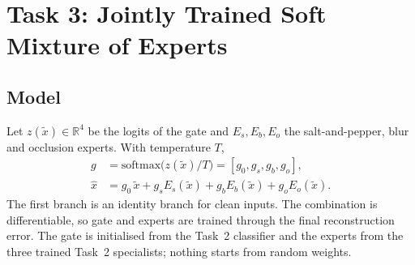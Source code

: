 \documentclass[conference]{IEEEtran}
\begin{document}
\section{Task 3: Jointly Trained Soft Mixture of Experts}
\subsection{Model}
Let $z(\tilde{x})\in\mathbb{R}^4$ be the logits of the gate and $E_s,E_b,E_o$ the salt-and-pepper, blur and occlusion experts. With temperature $T$,
\begin{align}
g &= \mathrm{softmax}\bigl(z(\tilde{x})/T\bigr)=[g_0,g_s,g_b,g_o],\\
\hat{x} &= g_0\,\tilde{x}+g_s E_s(\tilde{x})+g_b E_b(\tilde{x})+g_o E_o(\tilde{x}).
\end{align}
The first branch is an identity branch for clean inputs. The combination is differentiable, so gate and experts are trained through the final reconstruction error. The gate is initialised from the Task~2 classifier and the experts from the three trained Task~2 specialists; nothing starts from random weights.
\end{document}
